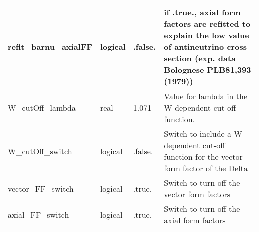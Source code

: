 \documentclass{article}
\begin{document}
\begin{longtable}{llll}
\midrule
refit\_barnu\_axialFF & \begin{minipage}[t]{2cm}logical\end{minipage} & \begin{minipage}[t]{2cm}.false.\end{minipage} & \begin{minipage}[t]{12cm}if .true., axial form factors are refitted to explain the low value of antineutrino cross section (exp. data  Bolognese PLB81,393 (1979))\end{minipage}\\*
\midrule
W\_cutOff\_lambda & \begin{minipage}[t]{2cm}real\end{minipage} & \begin{minipage}[t]{2cm}1.071\end{minipage} & \begin{minipage}[t]{12cm}Value for lambda in the W-dependent cut-off function.\end{minipage}\\*
\midrule
W\_cutOff\_switch & \begin{minipage}[t]{2cm}logical\end{minipage} & \begin{minipage}[t]{2cm}.false.\end{minipage} & \begin{minipage}[t]{12cm}Switch to include a W-dependent cut-off function for the vector form factor of the Delta\end{minipage}\\*
\midrule
vector\_FF\_switch & \begin{minipage}[t]{2cm}logical\end{minipage} & \begin{minipage}[t]{2cm}.true.\end{minipage} & \begin{minipage}[t]{12cm}Switch to turn off the vector form factors\end{minipage}\\*
\midrule
axial\_FF\_switch & \begin{minipage}[t]{2cm}logical\end{minipage} & \begin{minipage}[t]{2cm}.true.\end{minipage} & \begin{minipage}[t]{12cm}Switch to turn off the axial form factors\end{minipage}\\*
\midrule

\end{longtable}
\end{document}
